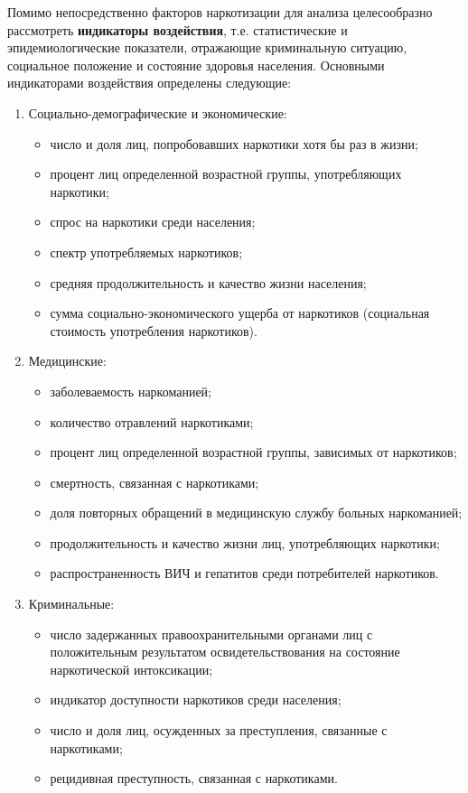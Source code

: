 \documentclass[a4paper,14pt]{article}
\begin{document}
Помимо непосредственно факторов наркотизации для анализа 
целесообразно рассмотреть \textbf{индикаторы воздействия}, т.е. статистические 
и эпидемиологические показатели, отражающие криминальную ситуацию, социальное 
положение и состояние здоровья населения.  Основными индикаторами воздействия 
определены следующие:
\begin{enumerate}		
    \item Социально-демографические и экономические:
    \begin{itemize}
        \item число и доля лиц, попробовавших наркотики хотя бы раз в жизни;
        \item процент лиц определенной возрастной группы, употребляющих наркотики;
        \item спрос на наркотики среди населения;
        \item спектр употребляемых наркотиков;
        \item средняя продолжительность и качество жизни населения;
        \item сумма социально-экономического ущерба от наркотиков (социальная 
            стоимость употребления наркотиков).
    \end{itemize}
    \item Медицинские:
    \begin{itemize}
        \item заболеваемость наркоманией;
        \item количество отравлений наркотиками;
        \item процент лиц определенной возрастной группы, зависимых от наркотиков;
        \item смертность, связанная с наркотиками;
        \item доля повторных обращений в медицинскую службу больных наркоманией;
        \item продолжительность и качество жизни лиц, употребляющих наркотики;
        \item распространенность ВИЧ и гепатитов среди потребителей наркотиков.
    \end{itemize}
	
    \item Криминальные:
    \begin{itemize}
        \item число задержанных правоохранительными органами лиц с положительным 
            результатом освидетельствования на состояние наркотической интоксикации;
        \item индикатор доступности наркотиков среди населения;
        \item число и доля лиц, осужденных за преступления, связанные с наркотиками;
        \item рецидивная преступность, связанная с наркотиками.
    \end{itemize}
\end{enumerate}
	
\end{document}
